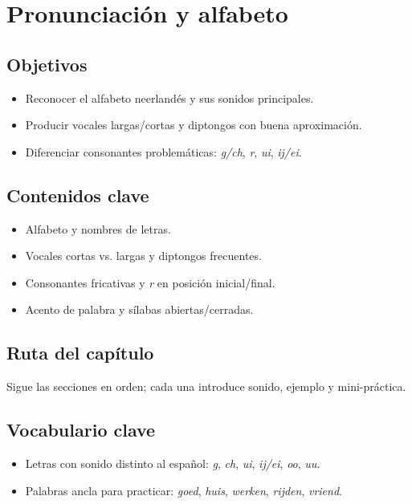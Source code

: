 \chapter{Pronunciación y alfabeto}
\section{Objetivos}
\begin{itemize}[leftmargin=*]
	\item Reconocer el alfabeto neerlandés y sus sonidos principales.
	\item Producir vocales largas/cortas y diptongos con buena aproximación.
	\item Diferenciar consonantes problemáticas: \textit{g/ch}, \textit{r}, \textit{ui}, \textit{ij/ei}.
\end{itemize}

\section{Contenidos clave}
\begin{itemize}[leftmargin=*]
	\item Alfabeto y nombres de letras.
	\item Vocales cortas vs. largas y diptongos frecuentes.
	\item Consonantes fricativas y \textit{r} en posición inicial/final.
	\item Acento de palabra y sílabas abiertas/cerradas.
\end{itemize}

\section{Ruta del capítulo}
Sigue las secciones en orden; cada una introduce sonido, ejemplo y mini-práctica.











\section{Vocabulario clave}
\begin{itemize}[leftmargin=*]
	\item Letras con sonido distinto al español: \textit{g}, \textit{ch}, \textit{ui}, \textit{ij/ei}, \textit{oo}, \textit{uu}.
	\item Palabras ancla para practicar: \textit{goed}, \textit{huis}, \textit{werken}, \textit{rijden}, \textit{vriend}.
\end{itemize}

